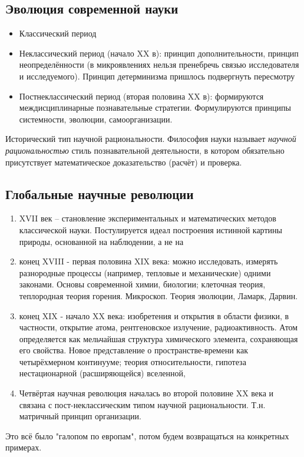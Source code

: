 \documentclass[a4paper,12pt]{article}
\begin{document}
\subsection{Эволюция современной науки}
\begin{itemize}[noitemsep]
	\item Классический период
	\item Неклассический период (начало XX в): принцип дополнительности, принцип неопределённости (в микроявлениях нельзя пренебречь связью исследователя и исследуемого). Принцип детерминизма пришлось подвергнуть пересмотру
	\item Постнеклассический период (вторая половина XX в): формируются междисциплинарные познавательные стратегии.
	Формулируются принципы системности, эволюции, самоорганизации.
\end{itemize}

Исторический тип научной рациональности.
Философия науки называет \emph{научной рациональностью} стиль познавательной деятельности, в котором обязательно присутствует математическое доказательство (расчёт) и проверка.

\subsection{Глобальные научные революции}

\begin{enumerate}[noitemsep]
	\item XVII век -- становление экспериментальных и математических методов классической науки. Постулируется идеал построения истинной картины природы, основанной на наблюдении, а не на 
	\item конец XVIII - первая половина XIX века: можно исследовать, измерять разнородные процессы (например, тепловые и механические) одними законами. Основы современной химии, биологии; клеточная теория, теплородная теория горения. Микроскоп. Теория эволюции, Ламарк, Дарвин.
	\item конец XIX - начало XX века: изобретения и открытия в области физики, в частности, открытие атома, рентгеновское излучение, радиоактивность. Атом определяется как мельчайшая структура химического элемента, сохраняющая его свойства. Новое представление о пространстве-времени как четырёхмерном континууме; теория относительности, гипотеза нестационарной (расширяющейся) вселенной,
	\item Четвёртая научная революция началась во второй половине XX века и связана с пост-неклассическим типом научной рациональности. Т.н. матричный принцип организации.
\end{enumerate}

Это всё было "галопом по европам", потом будем возвращаться на конкретных примерах.
\end{document}
